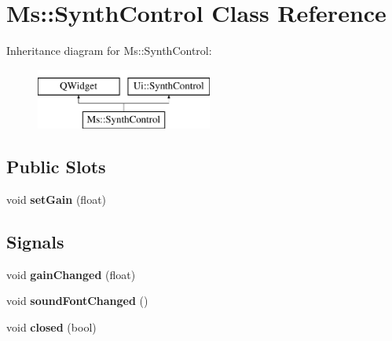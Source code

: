 \hypertarget{class_ms_1_1_synth_control}{}\section{Ms\+:\+:Synth\+Control Class Reference}
\label{class_ms_1_1_synth_control}
Inheritance diagram for Ms\+:\+:Synth\+Control\+:\begin{figure}[H]
\begin{center}
\leavevmode
\includegraphics[height=2.000000cm]{class_ms_1_1_synth_control}
\end{center}
\end{figure}
\subsection*{Public Slots}
\begin{DoxyCompactItemize}
\item 
\mbox{\label{class_ms_1_1_synth_control_a3931aaa57db6526d7de96adf6cb50df1}} 
void {\bfseries set\+Gain} (float)
\end{DoxyCompactItemize}
\subsection*{Signals}
\begin{DoxyCompactItemize}
\item 
\mbox{\label{class_ms_1_1_synth_control_ad3be79959fbc4902d29eb630909e24a0}} 
void {\bfseries gain\+Changed} (float)
\item 
\mbox{\label{class_ms_1_1_synth_control_ac99673125f3f01ffd22501966eec93b5}} 
void {\bfseries sound\+Font\+Changed} ()
\item 
\mbox{\label{class_ms_1_1_synth_control_aaa2b5dbbaf6d799088de92fb9cd688be}} 
void {\bfseries closed} (bool)
\end{DoxyCompactItemize}
